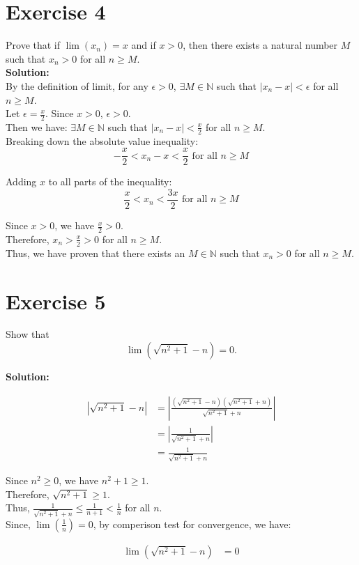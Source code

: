 \documentclass{article}
\begin{document}
\newpage

\section*{Exercise 4}
Prove that if $\lim(x_n) = x$ and if $x > 0$, then there exists a natural number $M$ such that $x_n > 0$ for all $n \geq M$. \\

\textbf{Solution:} \\

By the definition of limit, for any $\epsilon > 0$, 
$\exists M \in \mathbb{N}$ such that $|x_n - x| < \epsilon$ for all $n \geq M$. \\

Let $\epsilon = \frac{x}{2}$. Since $x > 0$, $\epsilon > 0$. \\

Then we have:
$\exists M \in \mathbb{N}$ such that $|x_n - x| < \frac{x}{2}$ for all $n \geq M$. \\

Breaking down the absolute value inequality:
$$-\frac{x}{2} < x_n - x < \frac{x}{2} \text{ for all } n \geq M$$

Adding $x$ to all parts of the inequality:
$$\frac{x}{2} < x_n < \frac{3x}{2} \text{ for all } n \geq M$$

Since $x > 0$, we have $\frac{x}{2} > 0$. \\

Therefore, $x_n > \frac{x}{2} > 0$ for all $n \geq M$. \\

Thus, we have proven that there exists an $M \in \mathbb{N}$ such that $x_n > 0$ for all $n \geq M$.

\newpage

\section*{Exercise 5}
Show that
\[\lim\left(\sqrt{n^2 + 1} - n\right) = 0.\]

\textbf{Solution:}

\begin{align*}
|\sqrt{n^2 + 1} - n| &= \left|\frac{(\sqrt{n^2 + 1} - n)(\sqrt{n^2 + 1} + n)}{\sqrt{n^2 + 1} + n}\right| \\
&= \left|\frac{1}{\sqrt{n^2 + 1} + n}\right| \\
&= \frac{1}{\sqrt{n^2 + 1} + n}
\end{align*}

Since $n^2 \geq 0$, we have $n^2 + 1 \geq 1$. \\

Therefore, $\sqrt{n^2 + 1} \geq 1$. \\

Thus, $\frac{1}{\sqrt{n^2 + 1} + n} \leq \frac{1}{n+1} < \frac{1}{n}$ for all $n$. \\

Since, $\lim\left(\frac{1}{n}\right) = 0$, by comperison test for convergence, we have:

\begin{align*}
\lim\left(\sqrt{n^2 + 1} - n\right) &= 0
\end{align*}
\end{document}
